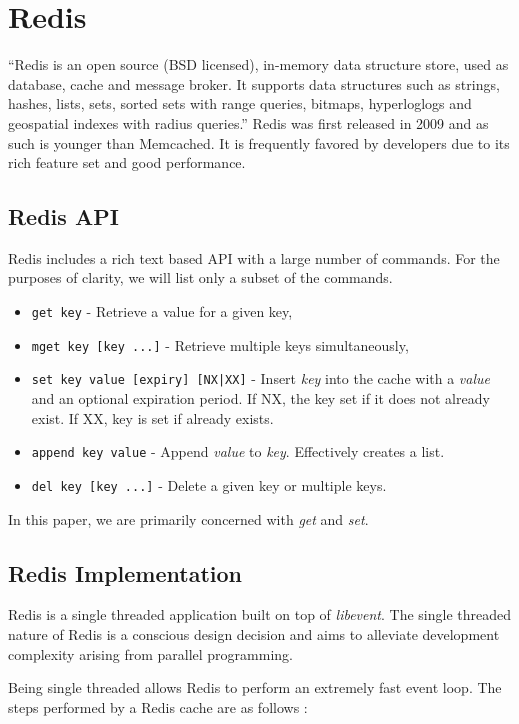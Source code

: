 \section{Redis}
``Redis is an open source (BSD licensed), in-memory data structure store, used as database, cache and message broker. It supports data structures such as strings, hashes, lists, sets, sorted sets with range queries, bitmaps, hyperloglogs and geospatial indexes with radius queries.'' \cite{redis} Redis was first released in 2009 and as such is younger than Memcached. It is frequently favored by developers due to its rich feature set and good performance.

\subsection{Redis API}
Redis includes a rich text based API with a large number of commands. For the purposes of clarity, we will list only a subset of the commands.

\begin{itemize}
    \item \texttt{get key} - Retrieve a value for a given key,
    \item \texttt{mget key [key ...]} - Retrieve multiple keys simultaneously,
    \item \texttt{set key value [expiry] [NX|XX]} - Insert \textit{key} into the cache with a \textit{value} and an optional expiration period. If NX, the key set if it does not already exist. If XX, key is set if already exists.
    \item \texttt{append key value} - Append \textit{value} to \textit{key}. Effectively creates a list.
    \item \texttt{del key [key ...]} - Delete a given key or multiple keys.
\end{itemize}

In this paper, we are primarily concerned with \textit{get} and \textit{set}.

\subsection{Redis Implementation}
Redis is a single threaded application built on top of \textit{libevent}. The single threaded nature of Redis is a conscious design decision and aims to alleviate development complexity arising from parallel programming.

Being single threaded allows Redis to perform an extremely fast event loop. The steps performed by a Redis cache are as follows \cite{redisUnderTheHood}:

